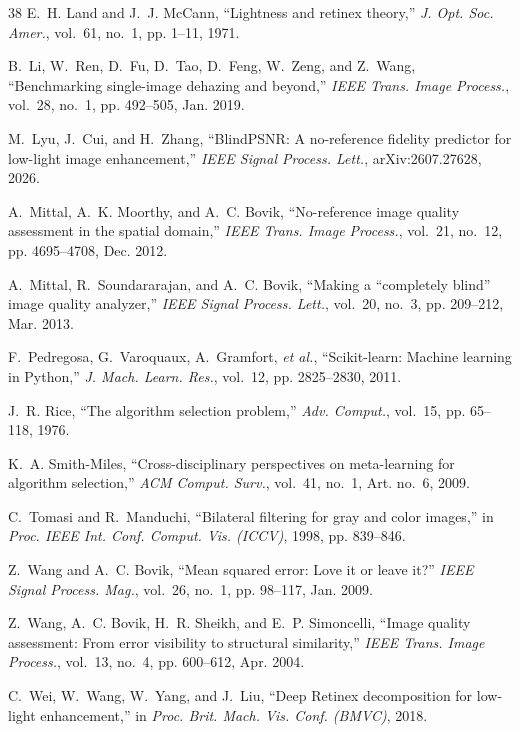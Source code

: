 \documentclass[journal]{IEEEtran}
\begin{document}
\begin{thebibliography}{38}
E.~H. Land and J.~J. McCann, ``Lightness and retinex theory,'' \emph{J. Opt. Soc. Amer.}, vol.~61, no.~1, pp. 1--11, 1971.

B.~Li, W.~Ren, D.~Fu, D.~Tao, D.~Feng, W.~Zeng, and Z.~Wang, ``Benchmarking single-image dehazing and beyond,'' \emph{IEEE Trans. Image Process.}, vol.~28, no.~1, pp. 492--505, Jan. 2019.

M.~Lyu, J.~Cui, and H.~Zhang, ``BlindPSNR: A no-reference fidelity predictor for low-light image enhancement,'' \emph{IEEE Signal Process. Lett.}, arXiv:2607.27628, 2026.

A.~Mittal, A.~K. Moorthy, and A.~C. Bovik, ``No-reference image quality assessment in the spatial domain,'' \emph{IEEE Trans. Image Process.}, vol.~21, no.~12, pp. 4695--4708, Dec. 2012.

A.~Mittal, R.~Soundararajan, and A.~C. Bovik, ``Making a ``completely blind'' image quality analyzer,'' \emph{IEEE Signal Process. Lett.}, vol.~20, no.~3, pp. 209--212, Mar. 2013.

F.~Pedregosa, G.~Varoquaux, A.~Gramfort, \emph{et al.}, ``Scikit-learn: Machine learning in Python,'' \emph{J. Mach. Learn. Res.}, vol.~12, pp. 2825--2830, 2011.

J.~R. Rice, ``The algorithm selection problem,'' \emph{Adv. Comput.}, vol.~15, pp. 65--118, 1976.

K.~A. Smith-Miles, ``Cross-disciplinary perspectives on meta-learning for algorithm selection,'' \emph{ACM Comput. Surv.}, vol.~41, no.~1, Art. no.~6, 2009.

C.~Tomasi and R.~Manduchi, ``Bilateral filtering for gray and color images,'' in \emph{Proc. IEEE Int. Conf. Comput. Vis. (ICCV)}, 1998, pp. 839--846.

Z.~Wang and A.~C. Bovik, ``Mean squared error: Love it or leave it?'' \emph{IEEE Signal Process. Mag.}, vol.~26, no.~1, pp. 98--117, Jan. 2009.

Z.~Wang, A.~C. Bovik, H.~R. Sheikh, and E.~P. Simoncelli, ``Image quality assessment: From error visibility to structural similarity,'' \emph{IEEE Trans. Image Process.}, vol.~13, no.~4, pp. 600--612, Apr. 2004.

C.~Wei, W.~Wang, W.~Yang, and J.~Liu, ``Deep Retinex decomposition for low-light enhancement,'' in \emph{Proc. Brit. Mach. Vis. Conf. (BMVC)}, 2018.


\end{thebibliography}
\end{document}
